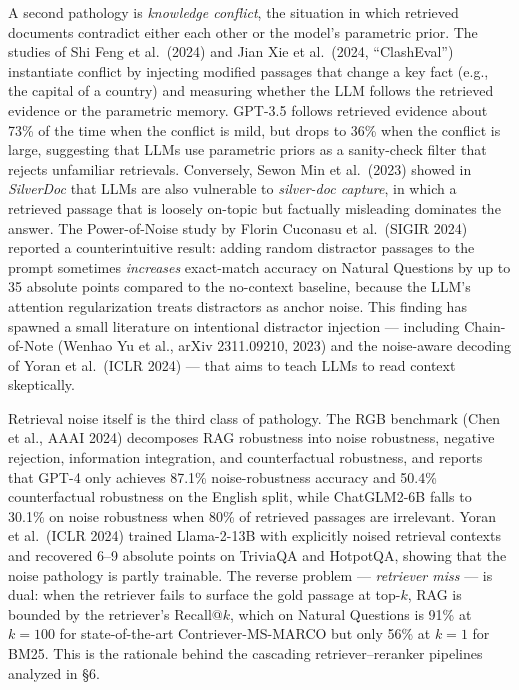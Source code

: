A second pathology is \emph{knowledge conflict}, the situation in which retrieved documents contradict either each other or the model's parametric prior. The studies of Shi Feng et al.~(2024) and Jian Xie et al.~(2024, ``ClashEval'') instantiate conflict by injecting modified passages that change a key fact (e.g., the capital of a country) and measuring whether the LLM follows the retrieved evidence or the parametric memory. GPT-3.5 follows retrieved evidence about 73\% of the time when the conflict is mild, but drops to 36\% when the conflict is large, suggesting that LLMs use parametric priors as a sanity-check filter that rejects unfamiliar retrievals. Conversely, Sewon Min et al.~(2023) showed in \emph{SilverDoc} that LLMs are also vulnerable to \emph{silver-doc capture}, in which a retrieved passage that is loosely on-topic but factually misleading dominates the answer. The Power-of-Noise study by Florin Cuconasu et al.~(SIGIR 2024) reported a counterintuitive result: adding random distractor passages to the prompt sometimes \emph{increases} exact-match accuracy on Natural Questions by up to 35 absolute points compared to the no-context baseline, because the LLM's attention regularization treats distractors as anchor noise. This finding has spawned a small literature on intentional distractor injection --- including Chain-of-Note (Wenhao Yu et al., arXiv 2311.09210, 2023) and the noise-aware decoding of Yoran et al.~(ICLR 2024) --- that aims to teach LLMs to read context skeptically.

Retrieval noise itself is the third class of pathology. The RGB benchmark (Chen et al., AAAI 2024) decomposes RAG robustness into noise robustness, negative rejection, information integration, and counterfactual robustness, and reports that GPT-4 only achieves 87.1\% noise-robustness accuracy and 50.4\% counterfactual robustness on the English split, while ChatGLM2-6B falls to 30.1\% on noise robustness when 80\% of retrieved passages are irrelevant. Yoran et al.~(ICLR 2024) trained Llama-2-13B with explicitly noised retrieval contexts and recovered 6--9 absolute points on TriviaQA and HotpotQA, showing that the noise pathology is partly trainable. The reverse problem --- \emph{retriever miss} --- is dual: when the retriever fails to surface the gold passage at top-\(k\), RAG is bounded by the retriever's Recall@\(k\), which on Natural Questions is 91\% at \(k=100\) for state-of-the-art Contriever-MS-MARCO but only 56\% at \(k=1\) for BM25. This is the rationale behind the cascading retriever--reranker pipelines analyzed in §6.

